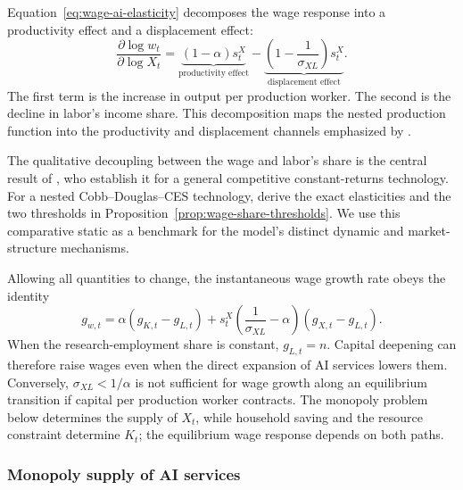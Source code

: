 Equation~\eqref{eq:wage-ai-elasticity} decomposes the wage response into a
productivity effect and a displacement effect:
\begin{equation}
    \frac{\partial\log w_t}{\partial\log X_t}
    =
    \underbrace{(1-\alpha)s^X_t}_{\text{productivity effect}}
    -
    \underbrace{\left(1-\frac{1}{\sigma_{XL}}\right)s^X_t}
    _{\text{displacement effect}}.
    \label{eq:wage-decomposition}
\end{equation}
The first term is the increase in output per production worker. The second is the
decline in labor's income share. This decomposition maps the nested production
function into the productivity and displacement channels emphasized by
\citet{acemoglurestrepo2019}.

The qualitative decoupling between the wage and labor's share is the central result
of \citet[Theorem~1]{autorkausik2026}, who establish it for a general competitive
constant-returns technology. For a nested Cobb--Douglas--CES technology,
\citet[Lemma~4.1 and Proposition~4.2]{yango2026} derive the exact elasticities and
the two thresholds in Proposition~\ref{prop:wage-share-thresholds}. We use this
comparative static as a benchmark for the model's distinct dynamic and
market-structure mechanisms.

Allowing all quantities to change, the instantaneous wage growth rate obeys the
identity
\begin{equation}
    g_{w,t}
    =
    \alpha\left(g_{K,t}-g_{L,t}\right)
    +
    s^X_t\left(\frac{1}{\sigma_{XL}}-\alpha\right)
    \left(g_{X,t}-g_{L,t}\right).
    \label{eq:dynamic-wage-decomposition}
\end{equation}
When the research-employment share is constant, $g_{L,t}=n$. Capital deepening can
therefore raise wages even when the direct expansion of AI services lowers them.
Conversely, $\sigma_{XL}<1/\alpha$ is not sufficient for wage growth along an equilibrium
transition if capital per production worker contracts. The monopoly problem below
determines the supply of $X_t$, while household saving and the resource constraint
determine $K_t$; the equilibrium wage response depends on both paths.

\subsubsection{Monopoly supply of AI services}

